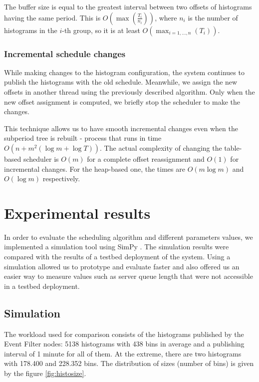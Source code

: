The buffer size is equal to the greatest interval between two offsets of histograms having the same period. This is  $O\left(\max\left(\frac {T_i}  {n_i}\right)\right)$, where $n_i$ is the number of histograms in the $i$-th group, so it is at least $O(\max_{i=1,\ldots,n}(T_i))$.

\subsubsection*{Incremental schedule changes}

While making changes to the histogram configuration, the system continues to publish the histograms with the old schedule. Meanwhile, we assign the new offsets in another thread using the previously described algorithm. Only when the new offset assignment is computed, we briefly stop the scheduler to make the changes.

This technique allows us to have smooth incremental changes even when the subperiod tree is rebuilt - process that runs in time $O(n+m^2(\log m+\log T))$. The actual complexity of changing the table-based scheduler is $O(m)$ for a complete offset reassignment and $O(1)$ for incremental changes. For the heap-based one, the times are $O(m\log m)$ and $O(\log m)$ respectively.

\section*{Experimental results}

In order to evaluate the scheduling algorithm and different parameters values, we implemented a simulation tool using SimPy \citep{simpy}. The simulation results were compared with the results of a testbed deployment of the system. Using a simulation allowed us to prototype and evaluate faster and also offered us an easier way to measure values such as server queue length that were not accessible in a testbed deployment.

\subsection*{Simulation}

The workload used for comparison consists of the histograms published by the Event Filter nodes: 5138 histograms with 438 bins in average and a publishing interval of 1 minute for all of them. At the extreme, there are two histograms with 178.400 and 228.352 bins. The distribution of sizes (number of bins) is given by the figure \ref{fig:histosize}.

